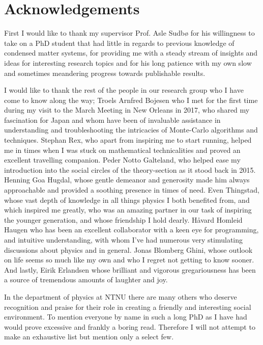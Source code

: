 \chapter*{Acknowledgements}\noindent
%
First I would like to thank my supervisor Prof. Asle Sudb{\o}  for his willingness to take on a PhD student
that had little in regards to previous knowledge of condensed matter systems, for providing me with a steady stream of insights
and ideas for interesting research topics and for his long patience with my own slow and sometimes meandering
progress towards publishable results. 

I would like to thank the rest of the people in our research group
who I have come to know along the way; Troels Arnfred Bojesen who I met for the first time during my
visit to the March Meeting in New Orleans in 2017, who shared my fascination for Japan and whom have been
of invaluable assistance in understanding and troubleshooting the intricacies of Monte-Carlo algorithms
and techniques. Stephan Rex, who apart from inspiring me to start running, helped me in times when I was
stuck on mathematical technicalities and proved an excellent travelling companion. Peder Notto Galteland, who
helped ease my introduction into the social circles of the theory-section as it stood back
in 2015. Henning Goa Hugdal, whose gentle
demeanor and generosity made him always approachable and provided a soothing presence in times of need.
Even Thingstad, whose vast depth of knowledge in all things physics I both benefited from, and which inspired
me greatly, who was an amazing partner in our task of inspiring the younger generation, and whose friendship I
hold dearly. Håvard Homleid Haugen who has been an excellent collaborator with a keen eye for programming,
and intuitive understanding, with whom I've had numerous very stimulating discussions about physics and in general.
Jonas Blomberg Ghini, whose outlook on life seems so much like my own and who I regret not getting to know sooner.
And lastly, Eirik Erlandsen
whose brilliant and vigorous gregariousness has been a source of tremendous amounts of laughter and joy.

In the department of physics at NTNU there are many others who deserve recognition and praise for their role in creating
a friendly and interesting social environment. To mention everyone by name in such a long PhD as I have had would
prove excessive and frankly a boring read. Therefore I will not attempt to make an exhaustive list but mention
only a select few. 


